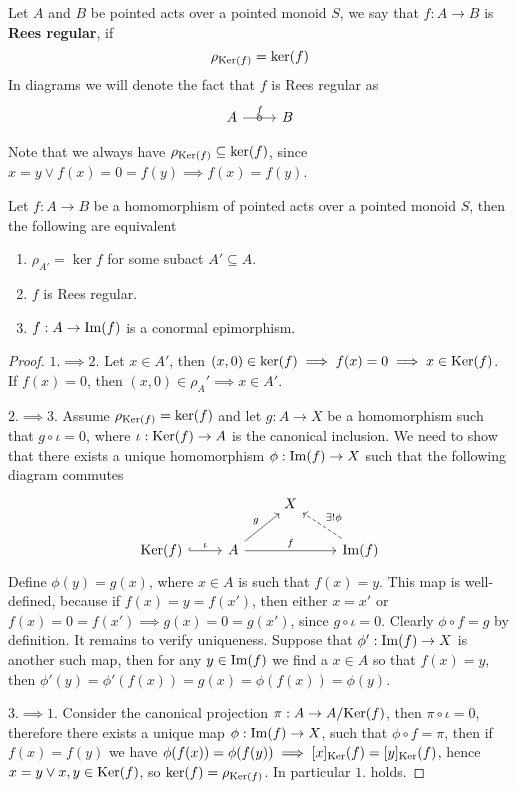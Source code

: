\begin{definition}
    Let $A$ and $B$ be pointed acts over a pointed monoid $S$, we say that 
    $f: A\to B$ is \textbf{Rees regular}, if 
    \[
        \rho_{\mathrm{Ker}(f)} = \mathrm{ker}(f)
    \]
    In diagrams we will denote the fact that $f$ is Rees regular as 
    \[\begin{tikzcd}
	A & B
	\arrow["f", "\circ"{marking}, from=1-1, to=1-2]
\end{tikzcd}\]
\end{definition}
\begin{remark}
    Note that we always have $\rho_{\mathrm{Ker}(f)}\subseteq\mathrm{ker}(f)$, since $x=y\lor f(x)=0=f(y)\implies f(x)=f(y)$.
\end{remark}
\begin{proposition}\label{regChar}
    Let $f: A\to B$ be a homomorphism of pointed acts over a pointed monoid $S$, then the following are equivalent
    \begin{enumerate}
        \item $\rho_{A'} = \ker{f}$ for some subact $A'\subseteq A$.
        \item $f$ is Rees regular.
        \item $f: A \to\mathrm{Im}(f)$ is a conormal epimorphism.
    \end{enumerate}
\end{proposition}
\begin{proof}
    $1.\implies 2.$ Let $x\in A'$, then $(x,0)\in\mathrm{ker}(f) \implies f(x)=0 \implies x \in\mathrm{Ker}(f)$. If $f(x)=0$, then 
    $(x,0)\in\rho_A' \implies x\in A'$. \par
    $2.\implies 3.$ Assume $\rho_{\mathrm{Ker}(f)} = \mathrm{ker}(f)$ and let $g: A\to X$ be a homomorphism such that $g\circ\iota = 0$, where
    $\iota: \mathrm{Ker}(f)\to A$ is the canonical inclusion. We need to show that there exists a unique homomorphism $\phi: \mathrm{Im}(f)\to X$ such that
    the following diagram commutes 
    \[\begin{tikzcd}
        && X \\
        {\Kernel{f}} & A && {\Image{f}}
        \arrow["\iota", hook, from=2-1, to=2-2]
        \arrow["g", from=2-2, to=1-3]
        \arrow["f", from=2-2, to=2-4]
        \arrow["{\exists ! \phi}"', dashed, from=2-4, to=1-3]
    \end{tikzcd}\]
    Define $\phi(y) = g(x)$, where $x\in A$ is such that $f(x)=y$. This map is well-defined, because if $f(x)=y=f(x')$, then
    either $x=x'$ or $f(x)=0=f(x') \implies g(x)=0=g(x')$, since $g\circ\iota = 0$. Clearly $\phi\circ f = g$ by definition.
    It remains to verify uniqueness. Suppose that $\phi': \mathrm{Im}(f)\to X$ is another such map, then for any $y\in\mathrm{Im}(f)$ we 
    find a $x\in A$ so that $f(x) = y$, then $\phi'(y) = \phi'(f(x)) = g(x) = \phi(f(x)) = \phi(y)$. \par
    $3. \implies 1.$ Consider the canonical projection $\pi : A \to A/\mathrm{Ker}(f)$, then $\pi\circ\iota = 0$, therefore 
    there exists a unique map $\phi: \mathrm{Im}(f)\to X$, such that $\phi\circ f = \pi$, then if $f(x)=f(y)$ we have 
    $\phi(f(x))=\phi(f(y)) \implies [x]_\mathrm{Ker}(f)=[y]_\mathrm{Ker}(f)$, hence $x=y \lor x,y\in\mathrm{Ker}(f)$, so 
    $\mathrm{ker}(f)=\rho_{\mathrm{Ker}(f)}$. In particular $1.$ holds.
\end{proof}
